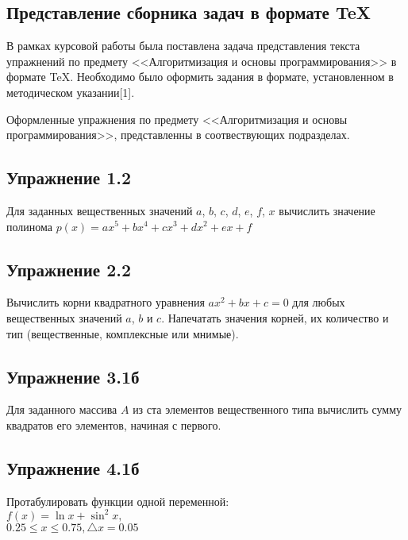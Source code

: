 \newpage
\begin{center}
\section{\fontsize{16pt}{16.8pt}Представление сборника задач в формате TeX }
\end{center}
\par
\fontsize{14pt}{16.8pt}\selectfont
В рамках курсовой работы была поставлена задача представления текста упражнений по предмету <<Алгоритмизация и основы программирования>> в формате TeX. Необходимо было оформить задания в формате, установленном в методическом указании[1].
\par
\fontsize{14pt}{16.8pt}\selectfont
Оформленные упражнения по предмету <<Алгоритмизация и основы программирования>>, представленны в соотвествующих подразделах.
\par

\subsection{\fontsize{14pt}{16.8pt}Упражнение 1.2}
\noindent
Для заданных вещественных значений $a$, $b$, $c$, $d$, $e$, $f$, $x$ вычислить значение полинома $p(x)=ax^5+bx^4+cx^3+dx^2+ex+f$

\subsection{\fontsize{14pt}{16.8pt}Упражнение 2.2}
\noindent
Вычислить корни квадратного уравнения $ax^2+bx+c=0$ для любых вещественных значений $a$, $b$ и $c$. Напечатать значения корней, их количество и тип (вещественные, комплексные или мнимые).

\subsection{\fontsize{14pt}{16.8pt}Упражнение 3.1б}
\noindent
Для заданного массива $A$ из ста элементов вещественного типа вычислить сумму квадратов его элементов, начиная с первого.
  
\subsection{\fontsize{14pt}{16.8pt}Упражнение 4.1б}
\noindent
Протабулировать функции одной переменной:\\[2mm]
    $ f(x) = \ln x  +\sin^2 x,$\\
    $0.25 \leq x \leq 0.75,\triangle x = 0.05 $

